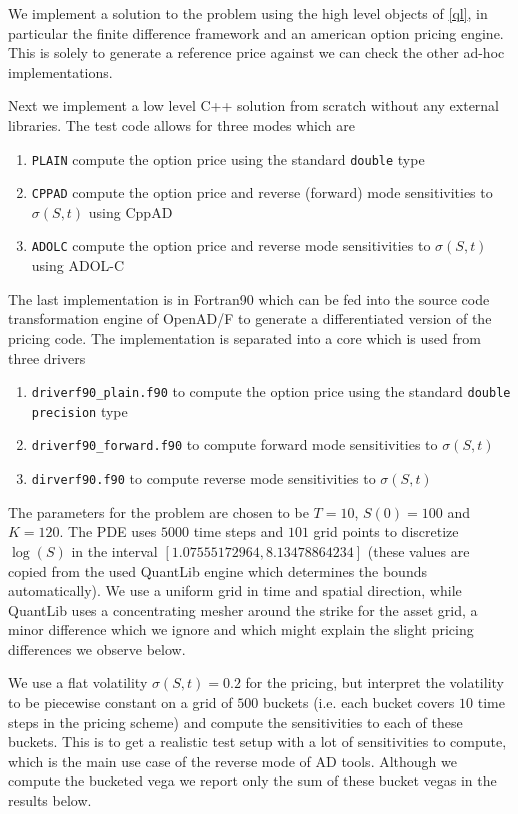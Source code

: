 \documentclass{amsart}
\theoremstyle{plain}
\numberwithin{equation}{section}
\begin{document}
We implement a solution to the problem using the high level objects of \ref{ql}, in particular the finite difference framework and an american option pricing engine. This is solely to generate a reference price against we can check the other ad-hoc implementations.

Next we implement a low level C++ solution from scratch without any external libraries. The test code allows for three modes which are

\begin{enumerate}
\item \verb+PLAIN+ compute the option price using the standard \verb+double+ type
\item \verb+CPPAD+ compute the option price and reverse (forward) mode sensitivities to $\sigma(S,t)$ using CppAD
\item \verb+ADOLC+ compute the option price and reverse mode sensitivities to $\sigma(S,t)$ using ADOL-C
\end{enumerate}

The last implementation is in Fortran90 which can be fed into the source code transformation engine of OpenAD/F to generate a differentiated version of the pricing code. The implementation is separated into a core which is used from three drivers

\begin{enumerate}
\item \verb+driverf90_plain.f90+ to compute the option price using the standard \verb+double precision+ type
\item \verb+driverf90_forward.f90+ to compute forward mode sensitivities to $\sigma(S,t)$
\item \verb+dirverf90.f90+ to compute reverse mode sensitivities to $\sigma(S,t)$
\end{enumerate}

The parameters for the problem are chosen to be $T=10$, $S(0)=100$ and $K=120$. The PDE uses $5000$ time steps and $101$ grid points to discretize $\log(S)$ in the interval $[1.07555172964,8.13478864234]$ (these values are copied from the used QuantLib engine which determines the bounds automatically). We use a uniform grid in time and spatial direction, while QuantLib uses a concentrating mesher around the strike for the asset grid, a minor difference which we ignore and which might explain the slight pricing differences we observe below.

We use a flat volatility $\sigma(S,t) = 0.2$ for the pricing, but interpret the volatility to be piecewise constant on a grid of $500$ buckets (i.e. each bucket covers $10$ time steps in the pricing scheme) and compute the sensitivities to each of these buckets. This is to get a realistic test setup with a lot of sensitivities to compute, which is the main use case of the reverse mode of AD tools. Although we compute the bucketed vega we report only the sum of these bucket vegas in the results below.
\end{document}
